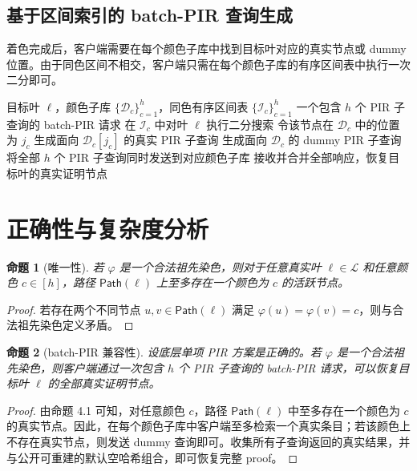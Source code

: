 \documentclass[UTF8]{ctexart}
\newtheorem{proposition}{命题}[section]
\begin{document}
	\subsection{基于区间索引的 batch-PIR 查询生成}
	
	着色完成后，客户端需要在每个颜色子库中找到目标叶对应的真实节点或 dummy 位置。由于同色区间不相交，客户端只需在每个颜色子库的有序区间表中执行一次二分即可。
	
	\begin{algorithm}[H]
		\caption{基于区间索引的 batch-PIR 查询生成}
		\label{alg:query}
		\begin{algorithmic}[1]
			\Require 目标叶 $\ell$，颜色子库 $\{\mathcal{D}_c\}_{c=1}^{h}$，同色有序区间表 $\{\mathcal{I}_c\}_{c=1}^{h}$
			\Ensure 一个包含 $h$ 个 PIR 子查询的 batch-PIR 请求
			\State 在 $\mathcal{I}_c$ 中对叶 $\ell$ 执行二分搜索
			\State 令该节点在 $\mathcal{D}_c$ 中的位置为 $j_c$
			\State 生成面向 $\mathcal{D}_c[j_c]$ 的真实 PIR 子查询
			\Else
			\State 生成面向 $\mathcal{D}_c$ 的 dummy PIR 子查询
			\EndIf
			\EndFor
			\State 将全部 $h$ 个 PIR 子查询同时发送到对应颜色子库
			\State 接收并合并全部响应，恢复目标叶的真实证明节点
		\end{algorithmic}
	\end{algorithm}
	
	\section{正确性与复杂度分析}
	
	\begin{proposition}[唯一性]
		若 $\varphi$ 是一个合法祖先染色，则对于任意真实叶 $\ell\in\mathcal{L}$ 和任意颜色 $c\in[h]$，路径 $\mathsf{Path}(\ell)$ 上至多存在一个颜色为 $c$ 的活跃节点。
	\end{proposition}
	
	\begin{proof}
		若存在两个不同节点 $u,v\in\mathsf{Path}(\ell)$ 满足 $\varphi(u)=\varphi(v)=c$，则与合法祖先染色定义矛盾。
	\end{proof}
	
	\begin{proposition}[batch-PIR 兼容性]
		设底层单项 PIR 方案是正确的。若 $\varphi$ 是一个合法祖先染色，则客户端通过一次包含 $h$ 个 PIR 子查询的 batch-PIR 请求，可以恢复目标叶 $\ell$ 的全部真实证明节点。
	\end{proposition}
	
	\begin{proof}
		由命题 4.1 可知，对任意颜色 $c$，路径 $\mathsf{Path}(\ell)$ 中至多存在一个颜色为 $c$ 的真实节点。因此，在每个颜色子库中客户端至多检索一个真实条目；若该颜色上不存在真实节点，则发送 dummy 查询即可。收集所有子查询返回的真实结果，并与公开可重建的默认空哈希组合，即可恢复完整 proof。
	\end{proof}
	
\end{document}
